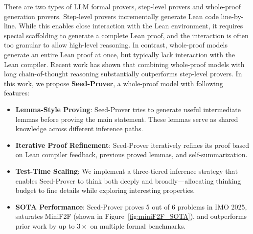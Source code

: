 There are two types of LLM formal provers, step-level provers \citep{alphaproof,polu2022formal,wu2024LeangithubcompilinggithubLean,wu2024internlm25stepproveradvancingautomatedtheorem,xin2025bfsproverscalablebestfirsttree} and whole-proof generation provers\citep{xin2025deepseekproverv,dong2025stpselfplayllmtheorem}.
Step-level provers incrementally generate Lean code line-by-line. While this enables close interaction with the Lean environment, it requires special scaffolding to generate a complete Lean proof, and the interaction is often too granular to allow high-level reasoning.
In contrast, whole-proof models generate an entire Lean proof at once, but typically lack interaction with the Lean compiler.
Recent work has shown that combining whole-proof models with long chain-of-thought reasoning \citep{kimina,deepseek-v2,lin2025goedel} substantially outperforms step-level provers.
In this work, we propose \textbf{Seed-Prover}, a whole-proof model with following features:
\begin{itemize}
    \item \textbf{Lemma-Style Proving}: Seed-Prover tries to generate useful intermediate lemmas before proving the main statement. These lemmas serve as shared knowledge across different inference paths.
    \item \textbf{Iterative Proof Refinement}: Seed-Prover iteratively refines its proof based on Lean compiler feedback, previous proved lemmas, and self-summarization.
    \item \textbf{Test-Time Scaling}: We implement a three-tiered inference strategy that enables Seed-Prover to think both deeply and broadly—allocating thinking budget to fine details while exploring interesting properties.
    \item \textbf{SOTA Performance}: Seed-Prover proves 5 out of 6 problems in IMO 2025, saturates MiniF2F \citep{zhengminif2f} (shown in Figure~\ref{fig:miniF2F_SOTA}), and outperforms prior work by up to $3\times$ on multiple formal benchmarks.
\end{itemize}


